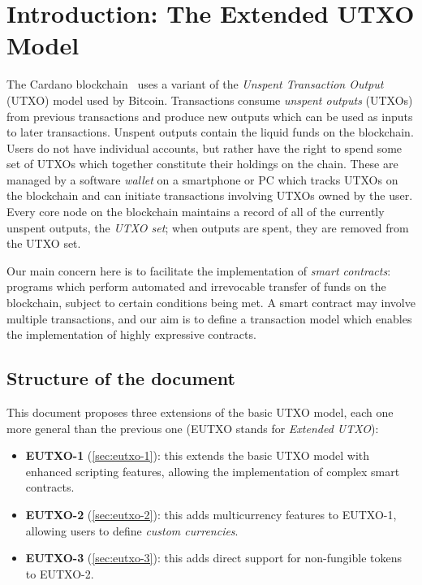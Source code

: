 \documentclass[a4paper]{article}
\theoremstyle{definition}  %
\begin{document}
\maketitle

\section{Introduction: The Extended UTXO Model}
\label{sec:intro}
The Cardano blockchain~\citep{Cardano, Cardano-ledger-spec} uses a
variant of the \emph{Unspent Transaction Output} (UTXO) model used
by Bitcoin.  Transactions consume \emph{unspent outputs} (UTXOs)
from previous transactions and produce new outputs which can be used
as inputs to later transactions.  Unspent outputs contain the liquid funds
on the blockchain. Users do not have individual accounts, but rather have
the right to spend some set of UTXOs which together constitute their holdings
on the chain. These are managed by a software \emph{wallet} on a smartphone or PC
which tracks UTXOs on the blockchain and can initiate transactions involving UTXOs
owned by the user.  Every core node on the blockchain maintains a
record of all of the currently unspent outputs, the \emph{UTXO set};
when outputs are spent, they are removed from the UTXO set.

Our main concern here is to facilitate the implementation of
\emph{smart contracts}: programs which perform automated and
irrevocable transfer of funds on the blockchain, subject to certain
conditions being met.  A smart contract may involve multiple
transactions, and our aim is to define a transaction model which
enables the implementation of highly expressive contracts.

\subsection{Structure of the document}
\label{sec:doc-structure}
This document proposes three extensions of the basic UTXO model, each
one more general than the previous one (EUTXO stands for
\emph{Extended UTXO}):

\begin{itemize}
  \item \textbf{EUTXO-1} (\cref{sec:eutxo-1}): this extends the
    basic UTXO model with enhanced scripting features, allowing the
    implementation of complex smart contracts.
  \item \textbf{EUTXO-2} (\cref{sec:eutxo-2}): this adds
    multicurrency features to EUTXO-1, allowing users to define
    \textit{custom currencies}.
  \item \textbf{EUTXO-3} (\cref{sec:eutxo-3}): this adds direct
    support for non-fungible tokens to EUTXO-2.
\end{itemize}
\end{document}
